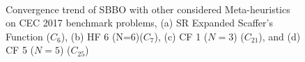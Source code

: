 \begin{figure}[h]
    \centering
\\
 \caption[Convergence trend of  IBBO and SBBO with other considered Meta-heuristics on CEC 2017 benchmark problems]{\fontsize{10pt}{12pt}\selectfont Convergence trend of SBBO with other considered Meta-heuristics on CEC 2017 benchmark problems, (a) SR Expanded Scaffer's Function ($C_6$), (b) HF 6 (N=6)($C_{7}$), (c) CF 1 ($N=3$) ($C_{21}$), and (d) CF 5 ($N=5$) ($C_{25}$) }
\label{fig:cg2}
\end{figure}
